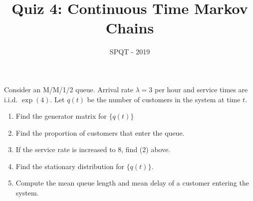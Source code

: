 \documentclass[a4paper,11pt,english]{article}
\title{Quiz 4: Continuous Time Markov Chains}
\author{SPQT - 2019}
\begin{document}
\maketitle
Consider an M/M/1/2 queue. Arrival rate $\lambda = 3$ per hour and service times are i.i.d. $\exp(4)$. Let $q(t)$ be the number of customers in the system at time $t$. 
\begin{enumerate}
\item Find the generator matrix for $\{q(t)\}$
\item Find the proportion of customers that enter the queue. 
\item If the service rate is increased to $8$, find (2) above. 
\item Find the stationary distribution for $\{q(t)\}$.
\item Compute the mean queue length and mean delay of a customer entering the system. 
\end{enumerate}
\end{document}
